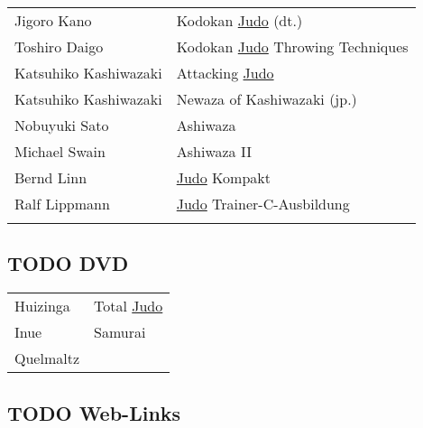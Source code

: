 \documentclass[11pt]{article}
\begin{document}
\begin{center}
\begin{tabular}{ll}
Jigoro Kano & Kodokan \hyperref[org5f8b831]{Judo} (dt.)\\
Toshiro Daigo & Kodokan \hyperref[org5f8b831]{Judo} Throwing Techniques\\
Katsuhiko Kashiwazaki & Attacking \hyperref[org5f8b831]{Judo}\\
Katsuhiko Kashiwazaki & Newaza of Kashiwazaki (jp.)\\
Nobuyuki Sato & Ashiwaza\\
Michael Swain & Ashiwaza II\\
Bernd Linn & \hyperref[org5f8b831]{Judo} Kompakt\\
Ralf Lippmann & \hyperref[org5f8b831]{Judo} Trainer-C-Ausbildung\\
 & \\
\end{tabular}
\end{center}

\subsection{{\bfseries\sffamily TODO} DVD}
\label{sec:orgb422c13}

\begin{center}
\begin{tabular}{ll}
Huizinga & Total \hyperref[org5f8b831]{Judo}\\
Inue & Samurai\\
Quelmaltz & \\
\end{tabular}
\end{center}

\subsection{{\bfseries\sffamily TODO} Web-Links}
\label{sec:orgce7b61b}
\end{document}
